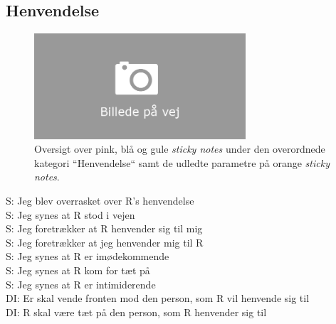 \subsection{Henvendelse}
%
\begin{figure}[H]
\centering
\includegraphics[width = 0.7\textwidth]{Figure/AffinityDiagram/Henvendelse} 
\caption{Oversigt over pink, blå og gule \textit{sticky notes} under den overordnede kategori ``Henvendelse`` samt de udledte parametre på orange \textit{sticky notes}.}
\label{fig:AFHenvendelse}
\end{figure}
\noindent
%
S: Jeg blev overrasket over R's henvendelse\\
S: Jeg synes at R stod i vejen\\
S: Jeg foretrækker at R henvender sig til mig\\
S: Jeg foretrækker at jeg henvender mig til R\\
S: Jeg synes at R er imødekommende\\
S: Jeg synes at R kom for tæt på\\
S: Jeg synes at R er intimiderende\\
DI: Er skal vende fronten mod den person, som R vil henvende sig til\\
DI: R skal være tæt på den person, som R henvender sig til\\

